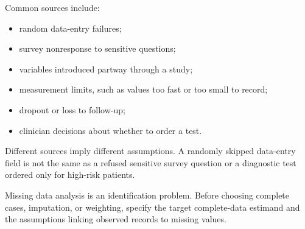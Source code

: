 Common sources include:
\begin{itemize}
  \item random data-entry failures;
  \item survey nonresponse to sensitive questions;
  \item variables introduced partway through a study;
  \item measurement limits, such as values too fast or too small to record;
  \item dropout or loss to follow-up;
  \item clinician decisions about whether to order a test.
\end{itemize}
Different sources imply different assumptions. A randomly skipped data-entry
field is not the same as a refused sensitive survey question or a diagnostic
test ordered only for high-risk patients.

\begin{keyidea}
Missing data analysis is an identification problem. Before choosing complete
cases, imputation, or weighting, specify the target complete-data estimand and
the assumptions linking observed records to missing values.
\end{keyidea}
